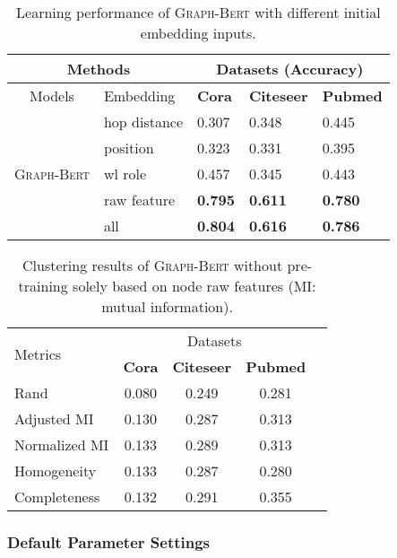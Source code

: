 \documentclass{article}
\newcommand{\our}{\textsc{Graph-Bert}}
\begin{document}
\begin{table}[t]
\caption{Learning performance of {\our} with different initial embedding inputs.}\label{tab:embedding_analysis}
 \small
\centering
\setlength{\tabcolsep}{3.5pt}
\begin{tabular}{|c|l|p{1.2cm}|p{1.2cm}|p{1.2cm}|}
\hline
\multicolumn{2}{|c}{Methods } & \multicolumn{3}{|c|}{Datasets (Accuracy)} \\
\hline
Models & Embedding & {\textbf{Cora}} & {\textbf{Citeseer}} & {\textbf{Pubmed}} \\
\hline 
\hline 
\multirow{5}{*}{{\our}}
&hop distance&{0.307}   &0.348  &{0.445}  \\
\cline{2-5}
&position&{0.323}   &0.331  &{0.395}  \\
\cline{2-5}
&wl role&0.457   &{0.345}  &0.443   \\
\cline{2-5}
&raw feature&\textbf{0.795}  &\textbf{0.611}  &\textbf{0.780}   \\
\cline{2-5}
&all&\textbf{0.804}   &\textbf{0.616}  &\textbf{0.786}  \\
\hline
\end{tabular}
\end{table}



\begin{table}[t]
\caption{Clustering results of {\our} without pre-training solely based on node raw features (MI: mutual information).}\label{tab:graph_clustering}
\centering
\small
\setlength{\tabcolsep}{3pt}
\begin{tabular}{l c c c c }
\toprule
 \multirow{2}{*}{Metrics}  & \multicolumn{3}{c}{Datasets} \\
\cline{2-4}
\addlinespace[0.05cm]
& \textbf{Cora} & \textbf{Citeseer} & \textbf{Pubmed} \\
\hline
\addlinespace[0.05cm]

{Rand} &0.080  & 0.249  &0.281   \\
{Adjusted MI} &0.130 &0.287 &0.313  \\
{Normalized MI} &0.133  &0.289  &0.313   \\
{Homogeneity} &0.133  &0.287  &0.280  \\
{Completeness} &0.132  &0.291  &0.355  \\
\bottomrule
\end{tabular}
\end{table}


\subsubsection{Default Parameter Settings}
\end{document}
